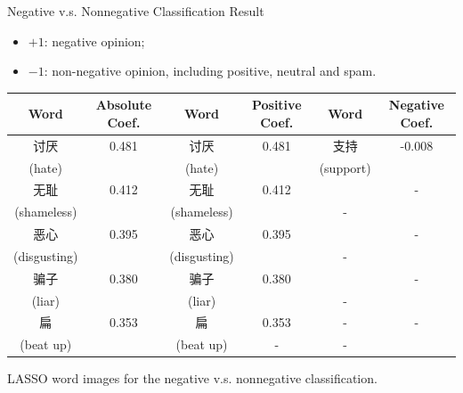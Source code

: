 \documentclass[12pt]{beamer}
\newcommand{\1}[1]{{\mathbf 1}\left\{#1\right\}}        %
\begin{document}
\begin{frame}{Negative v.s. Nonnegative Classification Result}
\begin{itemize}[<+->]
\item $+1$: negative opinion;
\item $-1$: non-negative opinion, including positive, neutral and spam.
\end{itemize}

\tiny
\begin{center}
\begin{tabular}{|c|c||c|c||c|c|}
\hline
Word & Absolute Coef. & Word & Positive Coef. & Word & Negative Coef.\\ \hline \hline
讨厌 & 0.481 & 讨厌 & 0.481 & 支持 & -0.008\\
(hate) & & (hate) & & (support) & \\\hline
无耻 & 0.412 & 无耻 & 0.412 &  & -\\
(shameless) & & (shameless) & & - & \\\hline
恶心 & 0.395 & 恶心 & 0.395 &  & -\\
(disgusting) & & (disgusting) & & - & \\\hline
骗子 & 0.380 & 骗子 & 0.380 &  & -\\
(liar) & & (liar) & & - & \\\hline
扁 & 0.353 & 扁 & 0.353 & - & -\\
(beat up) & & (beat up) &- & - & \\\hline
\end{tabular}
LASSO word images for the negative v.s. nonnegative classification.
\end{center}

\end{frame}


\end{document}
